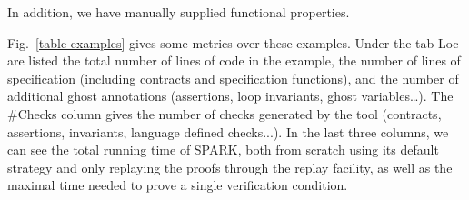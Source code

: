 \documentclass[runningheads]{llncs}
\begin{document}
%
In addition, we have manually supplied functional properties.

Fig.~\ref{table-examples} gives some metrics over these examples.
Under the tab Loc are listed the total number of lines of code in the example, the number of lines of specification (including contracts and specification functions), and the number of additional ghost annotations (assertions, loop invariants, ghost variables…). The \#Checks column gives the number of checks generated by the tool (contracts, assertions, invariants, language defined checks...). In the last three columns, we can see the total running time of SPARK, both from scratch using its default strategy and only replaying the proofs through the replay facility, as well as the maximal time needed to prove a single verification condition.
\end{document}
